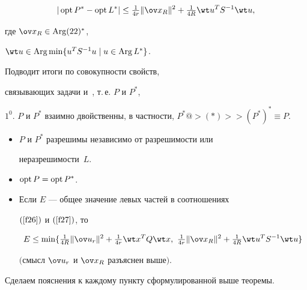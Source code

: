 \begin{equation}


\label{f27}


|\opt P^* -\opt L^*| \le \tfrac{ 1}{ 4r} \|


\ov x_R \|^2 + \tfrac{1}{4R} \wt u^T S^{-1} \wt u,


\end{equation}


где $\ov x_R\in\Arg (22)^*$,


$\wt u\in\Arg \min \{ u^T S^{-1} u \mid


u\in\Arg L^*\}$.


Подводит итоги по совокупности свойств,


связывающих задачи  и~, т.\,е.{} $P$ и $P^*$,





\begin{thm}\label{t3}


$1^0.$ $P$ и $P^*$ взаимно двойственны, в частности, $P^*


@>{(*)}>> (P^*)^* \equiv P$.


\begin{itemize}


\item[$2^0.$] $P$ и $P^*$ разрешимы независимо от разрешимости или


неразрешимости~$L$.


\item[$3^0.$] $\operatorname{opt} P =\operatorname{opt} P^*$.


\item[$4^0.$] Если $E$ --- общее значение левых частей в соотношениях


$\rf{f26}$ и $\rf{f27}$, то


$$


E\le \min \{ \tfrac{1}{4R} \| \ov u_r \|^2 +


\tfrac{1}{4r} \wt x^T Q \wt x,\ \tfrac{1}{4r} \|


\ov x_R \|^2 + \tfrac{ 1}{ 4R} \wt u^T S^{-1} \wt u \}


$$


$($смысл $\ov u_r$ и $\ov x_R$ разъяснен выше$)$.


\end{itemize}


\end{thm}





Сделаем пояснения к каждому пункту сформулированной выше теоремы.


